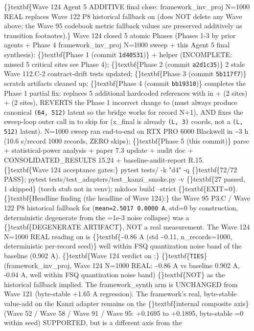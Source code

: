 \documentclass{article}
\begin{document}
\{\}textbf\{Wave 124 Agent 5 ADDITIVE  final close: framework\_inv\_proj N=1000 REAL replaces Wave 122 P8 historical fallback on  (does NOT delete any Wave above; the Wave 95 codebook metric fallback values are preserved additively as transition footnotes).\} Wave 124 closed 5 atomic Phases (Phases 1-3 by prior agents + Phase 4 framework\_inv\_proj N=1000 sweep + this Agent 5 final synthesis): \{\}textbf\{Phase 1 (commit \texttt{1d40531})\}   +  helper (INCOMPLETE: missed 5 critical sites  see Phase 4); \{\}textbf\{Phase 2 (commit \texttt{a2d1c35})\}  2 stale Wave 112.C-2 contract-drift tests updated; \{\}textbf\{Phase 3 (commit \texttt{5b117f7})\}   scratch artifacts cleaned up; \{\}textbf\{Phase 4 (commit \texttt{bb19310})\}  completes the Phase 1 partial fix: replaces 5 additional hardcoded  references with  in  +  (2 sites) +  (2 sites), REVERTS the Phase 1 incorrect change to  (must always produce canonical \texttt{(64, 512)} latent so the bridge works for record N+1), AND fixes the sweep-loop outer  call in  to skip for  (x\_final is already \texttt{(L, 3)} coords, not a \texttt{(L, 512)} latent). N=1000 sweep ran end-to-end on RTX PRO 6000 Blackwell in \textasciitilde{}3 h (10.6 s/record  1000 records, ZERO skips); \{\}textbf\{Phase 5 (this commit)\}  parse + statistical-power analysis + paper 7.3 update + audit doc + CONSOLIDATED\_RESULTS 15.24 + baseline-audit-report R.15. \{\}textbf\{Wave 124 acceptance gates:\} pytest tests/ -k "d4" -q  \{\}textbf\{72/72 PASS\}; pytest tests/test\_adapters/test\_kanzi\_smoke.py -v  \{\}textbf\{27 passed, 1 skipped\} (torch stub not in venv); mkdocs build --strict  \{\}textbf\{EXIT=0\}. \{\}textbf\{Headline finding (the headline of Wave 124):\} the Wave 95 P3.C / Wave 122 P8 historical fallback for  (\texttt{mean=2.5017  0.0000 A}, std=0 by construction, deterministic degenerate from the =1e-3 noise collapse) was a \{\}textbf\{DEGENERATE ARTIFACT\}, NOT a real measurement. The Wave 124 N=1000 REAL reading on  is \{\}textbf\{\textasciitilde{}0.86 A (std \textasciitilde{}0.11, n\_records=1000, deterministic per-record seed)\}  well within FSQ quantization noise band of the baseline (0.902 A). \{\}textbf\{Wave 124 verdict on :\} \{\}textbf\{\texttt{TIES}\} (framework\_inv\_proj, Wave 124 N=1000 REAL: \textasciitilde{}0.86 A vs baseline 0.902 A,   -0.04 A, well within FSQ quantization noise band)  \{\}textbf\{NOT\}  as the historical fallback implied. The framework\_synth arm is UNCHANGED from Wave 121 (byte-stable +1.65 A regression). The framework's real, byte-stable value-add on the Kanzi adapter remains on the \{\}textbf\{internal composite axis\} (Wave 52 / Wave 58 / Wave 91 / Wave 95: +0.1695 to +0.1895, byte-stable =0 within seed)  SUPPORTED, but is a different axis from the 
\end{document}
